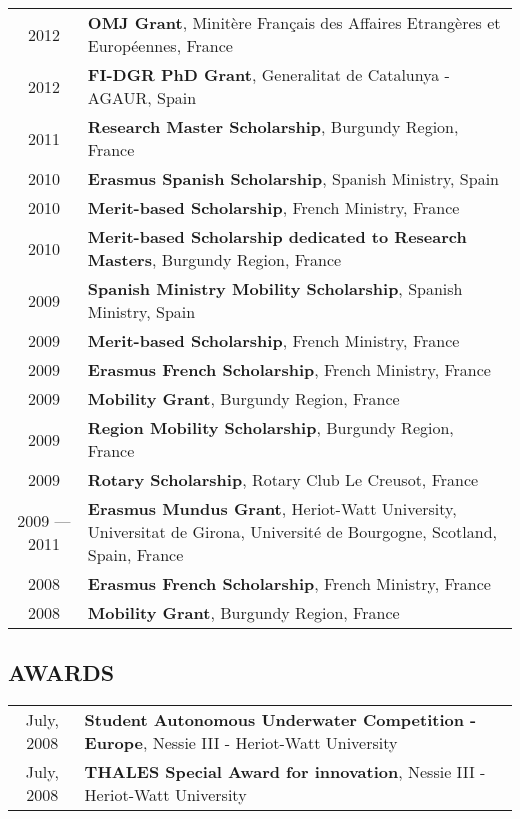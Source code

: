 {\begin{table}[!h]
\begin{tabular}{c p{14cm}}
2012 & \textbf{OMJ Grant}, Minit\`ere Fran\c cais des Affaires Etrang\`eres et Europ\'eennes, France\\
2012 & \textbf{FI-DGR PhD Grant}, Generalitat de Catalunya - AGAUR, Spain\\
2011 & \textbf{Research Master Scholarship}, Burgundy Region, France\\
2010 & \textbf{Erasmus Spanish Scholarship}, Spanish Ministry, Spain\\
2010 & \textbf{Merit-based Scholarship}, French Ministry, France\\
2010 & \textbf{Merit-based Scholarship dedicated to Research Masters}, Burgundy Region, France\\
2009 & \textbf{Spanish Ministry Mobility Scholarship}, Spanish Ministry, Spain\\
2009 & \textbf{Merit-based Scholarship}, French Ministry, France\\
2009 & \textbf{Erasmus French Scholarship}, French Ministry, France\\
2009 & \textbf{Mobility Grant}, Burgundy Region, France\\
2009 & \textbf{Region Mobility Scholarship}, Burgundy Region, France\\
2009 & \textbf{Rotary Scholarship}, Rotary Club Le Creusot, France\\
2009 --- 2011 & \textbf{Erasmus Mundus Grant}, Heriot-Watt University, Universitat de Girona, Universit\'e de Bourgogne, Scotland, Spain, France\\
2008 & \textbf{Erasmus French Scholarship}, French Ministry, France\\
2008 & \textbf{Mobility Grant}, Burgundy Region, France
\end{tabular}
\end{table}

\subsection{AWARDS}

\begin{table}[!h]
\begin{tabular}{c p{14cm}}
July, 2008 & \textbf{Student Autonomous Underwater Competition - Europe}, Nessie III - Heriot-Watt University \\
July, 2008 & \textbf{THALES Special Award for innovation}, Nessie III - Heriot-Watt University
\end{tabular}
\end{table}

}

